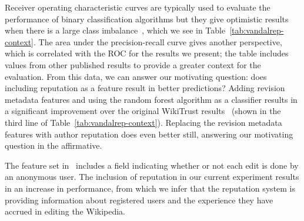 Receiver operating characteristic curves are typically used to evaluate
the performance of binary classification algorithms but they give
optimistic results when there is a large class
imbalance~\cite{DavisGoadrich2006}, which we see in
Table~\ref{tab:vandalrep-context}.
The area under the precision-recall curve gives another perspective,
which is correlated with the ROC for the results we present; the table
includes values from other published results to provide a greater
context for the evaluation.
From this data, we can answer our motivating question: does including
reputation as a feature result in better predictions?
Adding revision metadata features and using the random forest
algorithm as a classifier results in a significant improvement over the
original WikiTrust results~\cite{Adler2010b} (shown in the third line of
Table~\ref{tab:vandalrep-context}).
Replacing the revision metadata features with author reputation does even better still,
answering our motivating question in the affirmative.


The feature set in~\cite{Adler2010b} includes a field indicating whether
or not each edit is done by an anonymous user.
The inclusion of reputation in our current experiment results in an
increase in performance, from which we infer that the reputation system
is providing information about registered users and the experience they
have accrued in editing the Wikipedia.
